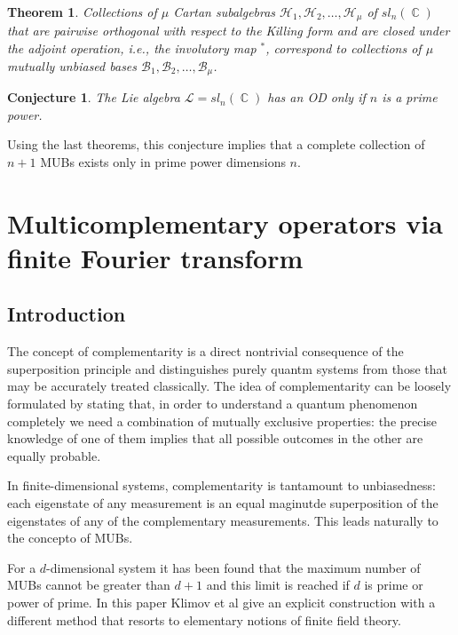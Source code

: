 \documentclass[a4paper]{article}
\DeclareMathOperator{\C}{\mathbb{C}}
\newtheorem{theorem}{Theorem}
\newtheorem{conjecture}{Conjecture}
\begin{document}
  \begin{theorem}
    Collections of $\mu$ Cartan subalgebras
    $\mathcal{H}_1,\mathcal{H}_2,\ldots,\mathcal{H}_\mu$ of
    $sl_n(\C)$ that are pairwise orthogonal with respect to
    the Killing form and are closed under the adjoint
    operation, i.e., the involutory map $^*$, correspond to
    collections of  $\mu$ mutually unbiased bases
    $\mathcal{B}_1,\mathcal{B}_2,\ldots,\mathcal{B}_\mu$.
  \end{theorem}

  \begin{conjecture}
    The Lie algebra $\mathcal{L} = sl_n(\C)$ has an OD only
    if $n$ is a prime power.
  \end{conjecture}

  Using the last theorems, this conjecture implies that a
  complete collection of $n+1$ MUBs exists only in prime
  power dimensions $n$.

  \section{Multicomplementary operators via finite Fourier
  transform}

  \subsection{Introduction}

  The concept of complementarity is a direct nontrivial
  consequence of the superposition principle and
  distinguishes purely quantm systems from those that may be
  accurately treated classically. The idea of
  complementarity can be loosely formulated by stating that,
  in order to understand a quantum phenomenon completely we
  need a combination of mutually exclusive properties: the
  precise knowledge of one of them implies that all possible
  outcomes in the other are equally probable.

  In finite-dimensional systems, complementarity is
  tantamount to unbiasedness: each eigenstate of any
  measurement is an equal maginutde superposition of the
  eigenstates of any of the complementary measurements. This
  leads naturally to the concepto of MUBs.

  For a $d$-dimensional system it has been found that the
  maximum number of MUBs cannot be greater than $d+1$ and
  this limit is reached if $d$ is prime or power of prime.
  In this paper Klimov et al give an explicit construction
  with a different method that resorts to elementary notions
  of finite field theory.
\end{document}
